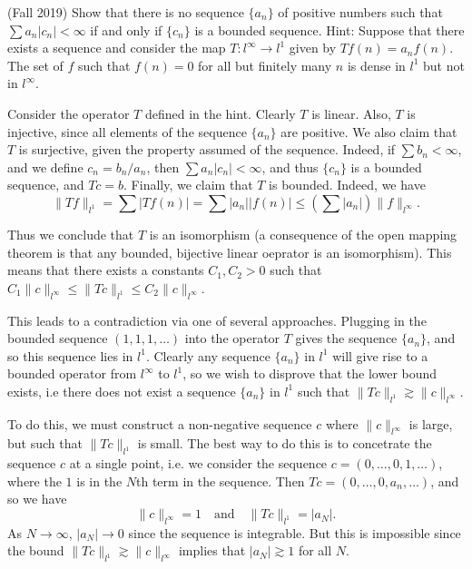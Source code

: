 \documentclass{exam}
\theoremstyle{problemstyle}
\newcommand{\1}[1]{\textbf{1}_{\left[#1\right]}} %
\begin{document}
\begin{questions}
\question (Fall 2019) Show that there is no sequence $\{ a_n \}$ of positive numbers such that $\sum a_n |c_n| < \infty$ if and only if $\{ c_n \}$ is a bounded sequence. Hint: Suppose that there exists a sequence and consider the map $T: l^\infty \to l^1$ given by $Tf(n) = a_n f(n)$. The set of $f$ such that $f(n) = 0$ for all but finitely many $n$ is dense in $l^1$ but not in $l^\infty$.
\begin{solution}
    Consider the operator $T$ defined in the hint. Clearly $T$ is linear. Also, $T$ is injective, since all elements of the sequence $\{ a_n \}$ are positive. We also claim that $T$ is surjective, given the property assumed of the sequence. Indeed, if $\sum b_n < \infty$, and we define $c_n = b_n/a_n$, then $\sum a_n |c_n| < \infty$, and thus $\{ c_n \}$ is a bounded sequence, and $Tc = b$. Finally, we claim that $T$ is bounded. Indeed, we have
    \[ \| Tf \|_{l^1} = \sum |Tf(n)| = \sum |a_n| |f(n)| \leq \left( \sum |a_n| \right) \| f \|_{l^\infty}. \]
   
   Thus we conclude that $T$ is an isomorphism (a consequence of the open mapping theorem is that any bounded, bijective linear oeprator is an isomorphism). This means that there exists a constants $C_1,C_2 > 0$ such that $C_1 \| c \|_{l^\infty} \leq \| Tc \|_{l^1} \leq C_2 \| c \|_{l^\infty}$.

   This leads to a contradiction via one of several approaches. Plugging in the bounded sequence $(1,1,1,\dots)$ into the operator $T$ gives the sequence $\{ a_n \}$, and so this sequence lies in $l^1$. Clearly any sequence $\{ a_n \}$ in $l^1$ will give rise to a bounded operator from $l^\infty$ to $l^1$, so we wish to disprove that the lower bound exists, i.e there does not exist a sequence $\{ a_n \}$ in $l^1$ such that $\| Tc \|_{l^1} \gtrsim \| c \|_{l^\infty}$.
    
    To do this, we must construct a non-negative sequence $c$ where $\| c \|_{l^\infty}$ is large, but such that $\| Tc \|_{l^1}$ is small. The best way to do this is to concetrate the sequence $c$ at a single point, i.e. we consider the sequence $c = (0,\dots,0,1,\dots)$, where the $1$ is in the $N$th term in the sequence. Then $Tc = (0,\dots,0,a_n,\dots)$, and so we have
    \[ \| c \|_{l^\infty} = 1 \quad\text{and}\quad \| Tc \|_{l^1} = |a_N|. \]
    As $N \to \infty$, $|a_N| \to 0$ since the sequence is integrable. But this is impossible since the bound $\| Tc \|_{l^1} \gtrsim \| c \|_{l^\infty}$ implies that $|a_N| \gtrsim 1$ for all $N$.


\end{solution}
\end{questions}
\end{document}
